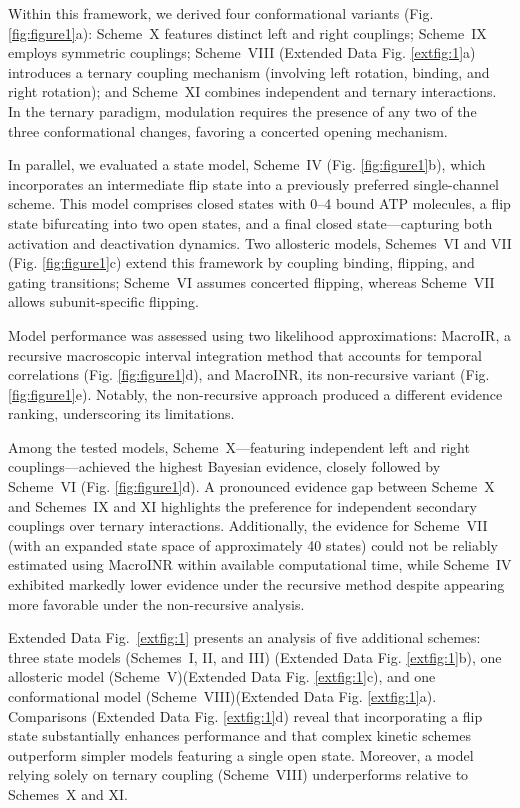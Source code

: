\documentclass[pdflatex,sn-nature]{sn-jnl}%
\theoremstyle{thmstyleone}%
\theoremstyle{thmstyletwo}%
\theoremstyle{thmstylethree}%
\begin{document}
Within this framework, we derived four conformational variants (Fig. \ref{fig:figure1}a): Scheme~X features distinct left and right couplings; Scheme~IX employs symmetric couplings; Scheme~VIII (Extended Data Fig. \ref{extfig:1}a) introduces a ternary coupling mechanism (involving left rotation, binding, and right rotation); and Scheme~XI combines independent and ternary interactions. In the ternary paradigm, modulation requires the presence of any two of the three conformational changes, favoring a concerted opening mechanism.

In parallel, we evaluated a state model, Scheme~IV (Fig. \ref{fig:figure1}b), which incorporates an intermediate flip state into a previously preferred single-channel scheme. This model comprises closed states with 0–4 bound ATP molecules, a flip state bifurcating into two open states, and a final closed state—capturing both activation and deactivation dynamics. Two allosteric models, Schemes~VI and VII (Fig. \ref{fig:figure1}c) extend this framework by coupling binding, flipping, and gating transitions; Scheme~VI assumes concerted flipping, whereas Scheme~VII allows subunit-specific flipping.

Model performance was assessed using two likelihood approximations: MacroIR, a recursive macroscopic interval integration method that accounts for temporal correlations (Fig. \ref{fig:figure1}d), and MacroINR, its non-recursive variant (Fig. \ref{fig:figure1}e). Notably, the non-recursive approach produced a different evidence ranking, underscoring its limitations.

Among the tested models, Scheme~X—featuring independent left and right couplings—achieved the highest Bayesian evidence, closely followed by Scheme~VI (Fig. \ref{fig:figure1}d). A pronounced evidence gap between Scheme~X and Schemes~IX and XI highlights the preference for independent secondary couplings over ternary interactions. Additionally, the evidence for Scheme~VII (with an expanded state space of approximately 40 states) could not be reliably estimated using MacroINR within available computational time, while Scheme~IV exhibited markedly lower evidence under the recursive method despite appearing more favorable under the non-recursive analysis.

Extended Data Fig.~\ref{extfig:1} presents an analysis of five additional schemes: three state models (Schemes~I, II, and III) (Extended Data Fig. \ref{extfig:1}b), one allosteric model (Scheme~V)(Extended Data Fig. \ref{extfig:1}c), and one conformational model (Scheme~VIII)(Extended Data Fig. \ref{extfig:1}a). Comparisons (Extended Data Fig. \ref{extfig:1}d) reveal that incorporating a flip state substantially enhances performance and that complex kinetic schemes outperform simpler models featuring a single open state. Moreover, a model relying solely on ternary coupling (Scheme~VIII) underperforms relative to Schemes~X and XI.
\end{document}
